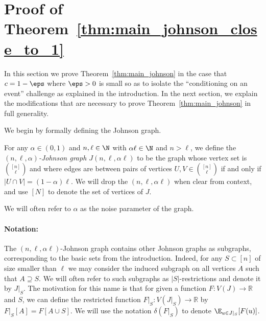 \section{Proof of Theorem~\ref{thm:main_johnson_close_to_1}}
\label{sec:johnson_1}
In this section we prove Theorem~\ref{thm:main_johnson} 
in the case that $c = 1-\eps$ where $\eps>0$ is small 
so as to isolate the ``conditioning on an event'' challenge as explained in the introduction. In the next section, we explain the modifications that are necessary to prove Theorem~\ref{thm:main_johnson} in full generality. 

We begin by formally defining the Johnson graph.

\begin{definition} \label{def:johnson}
For any $\alpha \in (0,1)$ and $n,\ell \in \N$ with $\alpha\ell \in \N$ and $n > \ell$, we define the \emph{$(n,\ell,\alpha)$-Johnson graph $J(n,\ell,\alpha\ell )$} to be the graph whose vertex set is $\binom{[n]}{\ell}$ and where edges are between pairs of vertices $U,V \in \binom{[n]}{\ell}$ if and only if $|U \cap V| = (1-\alpha)\ell$. We will drop the $(n,\ell,\alpha\ell)$ when clear from context,  
and use $[N]$ to denote the set of vertices of $J$. 

We will often refer to $\alpha$ as the noise parameter 
of the graph.
\end{definition}

\paragraph{Notation:}
The $(n,\ell,\alpha\ell)$-Johnson graph contains other Johnson graphs as subgraphs, corresponding to the basic sets from 
the introduction. Indeed, for any $S \subset [n]$ of size 
smaller than $\ell$ we may consider the induced subgraph on 
all vertices $A$ such that $A\supseteq S$. We will often 
refer to such subgraphs as $|S|$-restrictions and denote it by $J|_S$. The 
motivation for this name is that for given a function $F\colon V(J)\to \mathbb{R}$ 
and $S$, we can define the restricted function 
$F|_{S}\colon V(J|_S)\to\mathbb{R}$ by $F|_{S}[A] = F[A\cup S]$. We will use the notation $\delta(F|_S)$ to denote $\E_{u \in J|_S}[F(u)]$.



